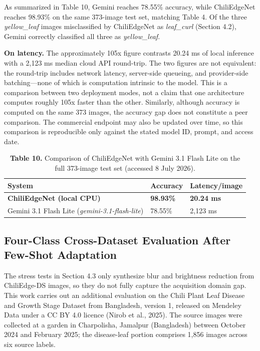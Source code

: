 As summarized in Table 10, Gemini reaches 78.55\% accuracy, while ChiliEdgeNet reaches 98.93\% on the same 373-image test set, matching Table 4. Of the three \emph{yellow\_leaf} images misclassified by ChiliEdgeNet as \emph{leaf\_curl} (Section 4.2), Gemini correctly classified all three as \emph{yellow\_leaf}.

\textbf{On latency.} The approximately 105x figure contrasts 20.24 ms of local inference with a 2,123 ms median cloud API round-trip. The two figures are not equivalent: the round-trip includes network latency, server-side queueing, and provider-side batching---none of which is computation intrinsic to the model. This is a comparison between two deployment modes, not a claim that one architecture computes roughly 105x faster than the other. Similarly, although accuracy is computed on the same 373 images, the accuracy gap does not constitute a peer comparison. The commercial endpoint may also be updated over time, so this comparison is reproducible only against the stated model ID, prompt, and access date.

\begin{table}[H]
\centering
\caption*{\textbf{Table 10.} Comparison of ChiliEdgeNet with Gemini 3.1 Flash Lite on the full 373-image test set (accessed 8 July 2026).}
\label{tab:10}
\scriptsize
\renewcommand{\arraystretch}{1.15}
\begin{tabular}{lll}
\toprule
\textbf{System} & \textbf{Accuracy} & \textbf{Latency/image} \\
\midrule
\textbf{ChiliEdgeNet (local CPU)} & \textbf{98.93\%} & \textbf{20.24 ms} \\
Gemini 3.1 Flash Lite (\emph{gemini-3.1-flash-lite}) & 78.55\% & 2,123 ms \\
\bottomrule
\end{tabular}
\end{table}

\subsection{Four-Class Cross-Dataset Evaluation After Few-Shot Adaptation}\label{four-class-cross-dataset-evaluation-after-few-shot-adaptation}

The stress tests in Section 4.3 only synthesize blur and brightness reduction from ChiliEdge-DS images, so they do not fully capture the acquisition domain gap. This work carries out an additional evaluation on the Chili Plant Leaf Disease and Growth Stage Dataset from Bangladesh, version 1, released on Mendeley Data under a CC BY 4.0 licence (Nirob et al., 2025). The source images were collected at a garden in Charpolisha, Jamalpur (Bangladesh) between October 2024 and February 2025; the disease-leaf portion comprises 1,856 images across six source labels.

